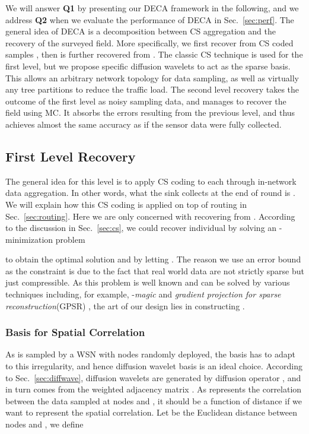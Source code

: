 \documentclass[conference]{IEEEtran}
\begin{document}
    We will answer \textbf{Q1} by presenting our DECA framework in the following, and we address \textbf{Q2} when we evaluate the performance of DECA in Sec.~\ref{sec:perf}. The general idea of DECA is a decomposition between CS aggregation and the recovery of the surveyed field. More specifically, we first recover  from CS coded samples , then  is further recovered from . The classic CS technique is used for the first level, but we propose specific diffusion wavelets to act as the sparse basis. This allows an arbitrary network topology for data sampling, as well as virtually any tree partitions to reduce the traffic load. The second level recovery takes the outcome of the first level as noisy sampling data, and manages to recover the field using MC. It absorbs the errors resulting from the previous level, and thus achieves almost the same accuracy as if the sensor data were fully collected.

  \subsection{First Level Recovery} \label{sec:1level}
The general idea for this level is to apply CS coding to each  through in-network data aggregation. In other words, what the sink collects at the end of round  is . We will explain how this CS coding is applied on top of routing in Sec.~\ref{sec:routing}. Here we are only concerned with recovering  from . According to the discussion in Sec.~\ref{sec:cs}, we could recover individual  by solving an -minimization problem
    
to obtain the optimal solution  and by letting . The reason we use an error bound as the constraint is due to the fact that real world data are not strictly sparse but just compressible. As this problem is well known and can be solved by various techniques including, for example, -\textit{magic} \cite{L1magic} and \textit{gradient projection for sparse  reconstruction}(GPSR) \cite{GPSR}, the art of our design lies in constructing .

    \subsubsection{Basis for Spatial Correlation} \label{sec:spatial}
As  is sampled by a WSN with nodes randomly deployed, the basis  has to adapt to this irregularity, and hence diffusion wavelet basis is an ideal choice. According to Sec.~\ref{sec:diffwave}, diffusion wavelets are generated by diffusion operator , and  in turn comes from the weighted adjacency matrix . As  represents the correlation between the data sampled at nodes  and , it should be a function of distance if we want to represent the spatial correlation. Let  be the Euclidean distance between nodes  and ,  we define
      
\end{document}
